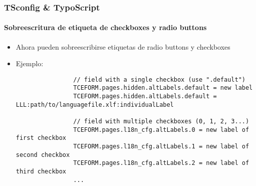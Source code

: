 
\begin{frame}[fragile]
	\frametitle{TSconfig \& TypoScript}
	\framesubtitle{Sobreescritura de etiqueta de checkboxes y radio buttons}

	\lstset{basicstyle=\tiny\ttfamily}

	\begin{itemize}

		\item Ahora pueden sobreescribirse etiquetas de radio buttons y checkboxes
		\item Ejemplo:

			\begin{lstlisting}
				// field with a single checkbox (use ".default")
				TCEFORM.pages.hidden.altLabels.default = new label
				TCEFORM.pages.hidden.altLabels.default = LLL:path/to/languagefile.xlf:individualLabel

				// field with multiple checkboxes (0, 1, 2, 3...)
				TCEFORM.pages.l18n_cfg.altLabels.0 = new label of first checkbox
				TCEFORM.pages.l18n_cfg.altLabels.1 = new label of second checkbox
				TCEFORM.pages.l18n_cfg.altLabels.2 = new label of third checkbox
				...
			\end{lstlisting}

	\end{itemize}

\end{frame}


